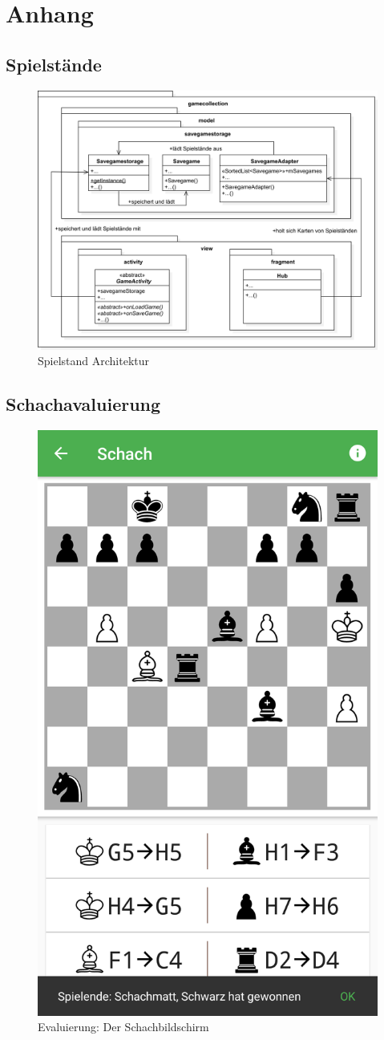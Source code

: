 \chapter{Anhang}

\section{Spielstände}
\sectionauthor{\leonard}

\begin{figure}[h]
	\centering
	\includegraphics[width=1.0\textwidth]{resources/savegamestorage/Savegamestorage}
	\caption{Spielstand Architektur}
\end{figure}

\section{Schachavaluierung}

\begin{figure}[p]
\centering
\includegraphics[width=.3\textwidth]{resources/evaluierung/chess/screen}
\caption{Evaluierung: Der Schachbildschirm}
\label{fig:screen}
\end{figure}

